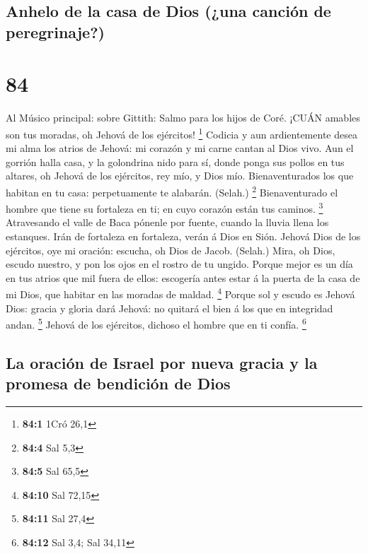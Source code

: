 \hypertarget{anhelo-de-la-casa-de-dios-una-canciuxf3n-de-peregrinaje}{%
\subsection{Anhelo de la casa de Dios (¿una canción de
peregrinaje?)}\label{anhelo-de-la-casa-de-dios-una-canciuxf3n-de-peregrinaje}}

\hypertarget{section-83}{%
\section{84}\label{section-83}}

 Al Músico principal: sobre Gittith: Salmo para los hijos de
Coré. ¡CUÁN amables son tus moradas, oh Jehová de los ejércitos!
\footnote{\textbf{84:1} 1Cró 26,1}  Codicia y aun
ardientemente desea mi alma los atrios de Jehová: mi corazón y mi carne
cantan al Dios vivo.  Aun el gorrión halla casa, y la
golondrina nido para sí, donde ponga sus pollos en tus altares, oh
Jehová de los ejércitos, rey mío, y Dios mío. 
Bienaventurados los que habitan en tu casa: perpetuamente te alabarán.
(Selah.) \footnote{\textbf{84:4} Sal 5,3}  Bienaventurado el
hombre que tiene su fortaleza en ti; en cuyo corazón están tus caminos.
\footnote{\textbf{84:5} Sal 65,5}  Atravesando el valle de
Baca pónenle por fuente, cuando la lluvia llena los estanques.
 Irán de fortaleza en fortaleza, verán á Dios en Sión.
 Jehová Dios de los ejércitos, oye mi oración: escucha, oh
Dios de Jacob. (Selah.)  Mira, oh Dios, escudo nuestro, y
pon los ojos en el rostro de tu ungido.  Porque mejor es un
día en tus atrios que mil fuera de ellos: escogería antes estar á la
puerta de la casa de mi Dios, que habitar en las moradas de maldad.
\footnote{\textbf{84:10} Sal 72,15}  Porque sol y escudo es
Jehová Dios: gracia y gloria dará Jehová: no quitará el bien á los que
en integridad andan. \footnote{\textbf{84:11} Sal 27,4} 
Jehová de los ejércitos, dichoso el hombre que en ti confía. \footnote{\textbf{84:12}
  Sal 3,4; Sal 34,11}

\hypertarget{la-oraciuxf3n-de-israel-por-nueva-gracia-y-la-promesa-de-bendiciuxf3n-de-dios}{%
\subsection{La oración de Israel por nueva gracia y la promesa de
bendición de
Dios}\label{la-oraciuxf3n-de-israel-por-nueva-gracia-y-la-promesa-de-bendiciuxf3n-de-dios}}

